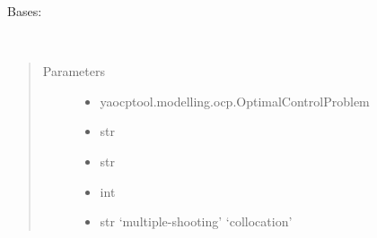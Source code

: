 \documentclass[letterpaper,10pt,english]{sphinxmanual}
\begin{document}
\begin{fulllineitems}
\label{\detokenize{yaocptool.methods.classic:yaocptool.methods.classic.indirectmethod.IndirectMethod}}
Bases: {\hyperref[\detokenize{yaocptool.methods.base:yaocptool.methods.base.solutionmethodsbase.SolutionMethodsBase}]{}}

\begin{fulllineitems}
\label{\detokenize{yaocptool.methods.classic:yaocptool.methods.classic.indirectmethod.IndirectMethod.__init__}}~\begin{quote}\begin{description}
\item[{Parameters}] \leavevmode\begin{itemize}
\item {} 
 \textendash{} yaocptool.modelling.ocp.OptimalControlProblem

\item {} 
 \textendash{} str

\item {} 
 \textendash{} str

\item {} 
 \textendash{} int

\item {} 
 \textendash{} str ‘multiple-shooting’ \textbar{} ‘collocation’

\end{itemize}

\end{description}\end{quote}

\end{fulllineitems}



\end{fulllineitems}
\end{document}
